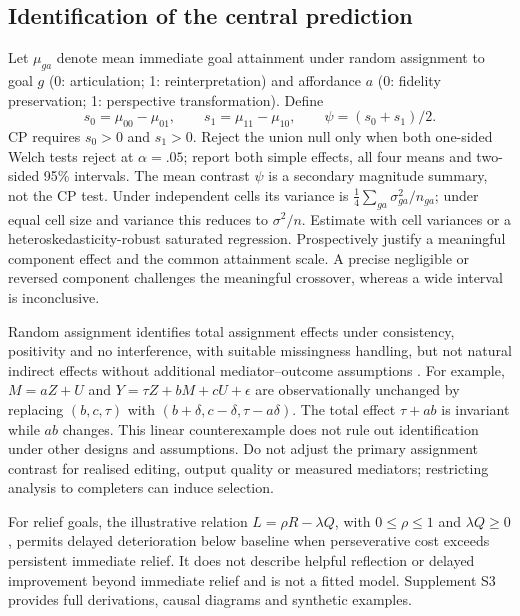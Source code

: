 \documentclass[11pt,a4paper]{article}
\begin{document}
\subsection{Identification of the central prediction}
Let $\mu_{ga}$ denote mean immediate goal attainment under random assignment to goal $g$ (0: articulation; 1: reinterpretation) and affordance $a$ (0: fidelity preservation; 1: perspective transformation). Define
\[
 s_0=\mu_{00}-\mu_{01},\qquad s_1=\mu_{11}-\mu_{10},\qquad
 \psi=(s_0+s_1)/2.
\]
CP requires $s_0>0$ and $s_1>0$. Reject the union null only when both one-sided Welch tests reject at $\alpha=.05$; report both simple effects, all four means and two-sided 95\% intervals. The mean contrast $\psi$ is a secondary magnitude summary, not the CP test. Under independent cells its variance is $\tfrac14\sum_{ga}\sigma_{ga}^2/n_{ga}$; under equal cell size and variance this reduces to $\sigma^2/n$. Estimate with cell variances or a heteroskedasticity-robust saturated regression. Prospectively justify a meaningful component effect and the common attainment scale. A precise negligible or reversed component challenges the meaningful crossover, whereas a wide interval is inconclusive.

Random assignment identifies total assignment effects under consistency, positivity and no interference, with suitable missingness handling, but not natural indirect effects without additional mediator--outcome assumptions \citep{imai2010}. For example, $M=aZ+U$ and $Y=\tau Z+bM+cU+\epsilon$ are observationally unchanged by replacing $(b,c,\tau)$ with $(b+\delta,c-\delta,\tau-a\delta)$. The total effect $\tau+ab$ is invariant while $ab$ changes. This linear counterexample does not rule out identification under other designs and assumptions. Do not adjust the primary assignment contrast for realised editing, output quality or measured mediators; restricting analysis to completers can induce selection.

For relief goals, the illustrative relation $L=\rho R-\lambda Q$, with $0\leq\rho\leq1$ and $\lambda Q\geq0$, permits delayed deterioration below baseline when perseverative cost exceeds persistent immediate relief. It does not describe helpful reflection or delayed improvement beyond immediate relief and is not a fitted model. Supplement S3 provides full derivations, causal diagrams and synthetic examples.
\end{document}
